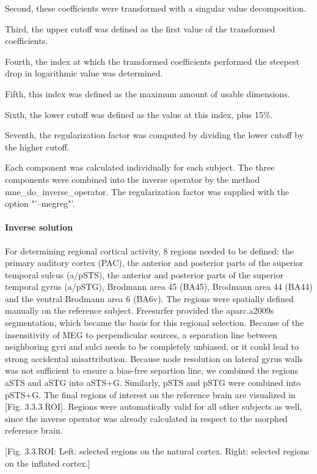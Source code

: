 Second, these coefficients were transformed with a singular value decomposition.

Third, the upper cutoff was defined as the first value of the transformed coefficients.

Fourth, the index at which the transformed coefficients performed the steepest drop in logarithmic value was determined.

Fifth, this index was defined as the maximum amount of usable dimensions.

Sixth, the lower cutoff was defined as the value at this index, plus 15\%.

Seventh, the regularization factor was computed by dividing the lower cutoff by the higher cutoff.


Each component was calculated individually for each subject.
The three components were combined into the inverse operator by the method mne\_do\_inverse\_operator.
The regularization factor was supplied with the option "'--megreg"'.

\paragraph{Inverse solution}
For determining regional cortical activity, 8 regions needed to be defined: the primary auditory cortex (PAC), the anterior and posterior parts of the superior temporal sulcus (a/pSTS), the anterior and posterior parts of the superior temporal gyrus (a/pSTG), Brodmann area 45 (BA45), Brodmann area 44 (BA44) and the ventral Brodmann area 6 (BA6v).
The regions were spatially defined manually on the reference subject.
Freesurfer provided the aparc.a2009s segmentation, which became the basis for this regional selection.
Because of the insensitivity of MEG to perpendicular sources, a separation line between neighboring gyri and sulci needs to be completely unbiased, or it could lead to strong accidental misattribution.
Because node resolution on lateral gyrus walls was not sufficient to ensure a bias-free separtion line, we combined the regions aSTS and aSTG into aSTS+G.
Similarly, pSTS and pSTG were combined into pSTS+G.
The final regions of interest on the reference brain are visualized in [Fig. 3.3.3.ROI].
Regions were automatically valid for all other subjects as well, since the inverse operator was already calculated in respect to the morphed reference brain.

[Fig. 3.3.ROI: Left: selected regions on the natural cortex. Right: selected regions on the inflated cortex.]


